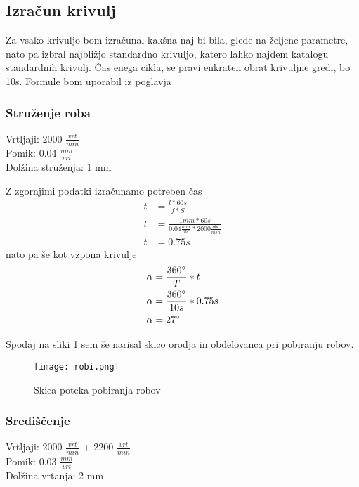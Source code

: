 \subsection{Izračun krivulj}
Za vsako krivuljo bom izračunal kakšna naj bi bila, glede na
željene parametre, nato pa izbral najbližjo standardno krivuljo,
katero lahko najdem katalogu standardnih krivulj.
Čas enega cikla, se pravi enkraten obrat krivuljne gredi, bo 10s.
Formule bom uporabil iz poglavja 

\subsubsection{Struženje roba}
Vrtljaji: 2000 \( \frac{vrt}{min} \) \\
Pomik: 0.04 \( \frac{mm}{vrt} \) \\
Dolžina struženja: 1 mm

Z zgornjimi podatki izračunamo potreben čas
\begin{equation}
	\begin{split}
		t &= \frac{l*60s}{f*S} \\
		t &= \frac{1mm*60s}{0.04\frac{mm}{obr}*2000\frac{obr}{min}} \\
		t &= 0.75 s
	\end{split}
\end{equation}
nato pa še kot vzpona krivulje
\begin{equation}
	\begin{split}
		\alpha &= \frac{360\degree}{T} * t \\
		\alpha &= \frac{360\degree}{10s} * 0.75 s\\
		\alpha &= 27\degree
	\end{split}
\end{equation}

Spodaj na sliki \ref{shema_robov} sem še narisal skico orodja
in obdelovanca pri pobiranju robov.

\begin{figure}[H]
	\begin{center}
		\texttt{[image: robi.png]}
		\caption{Skica poteka pobiranja robov
			\cite{lasten}}
		\label{shema_robov}
	\end{center}
\end{figure}

\subsubsection{Središčenje}
Vrtljaji: 2000 \( \frac{vrt}{min} \) + 2200 \( \frac{vrt}{min} \)\\
Pomik: 0.03 \( \frac{mm}{vrt} \) \\
Dolžina vrtanja: 2 mm

